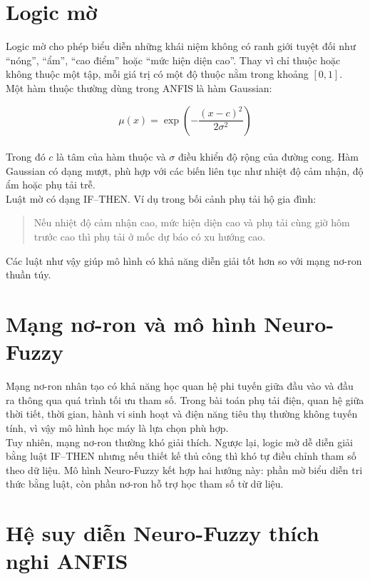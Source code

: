 \section{Logic mờ}

Logic mờ cho phép biểu diễn những khái niệm không có ranh giới tuyệt đối như ``nóng'', ``ẩm'', ``cao điểm'' hoặc ``mức hiện diện cao''. Thay vì chỉ thuộc hoặc không thuộc một tập, mỗi giá trị có một độ thuộc nằm trong khoảng $[0, 1]$.
\\
Một hàm thuộc thường dùng trong ANFIS là hàm Gaussian:

\begin{equation}
  \mu(x) = \exp\left(-\frac{(x-c)^2}{2\sigma^2}\right)
\end{equation}
\\
Trong đó $c$ là tâm của hàm thuộc và $\sigma$ điều khiển độ rộng của đường cong. Hàm Gaussian có dạng mượt, phù hợp với các biến liên tục như nhiệt độ cảm nhận, độ ẩm hoặc phụ tải trễ.
\\
Luật mờ có dạng IF--THEN. Ví dụ trong bối cảnh phụ tải hộ gia đình:

\begin{quote}
Nếu nhiệt độ cảm nhận cao, mức hiện diện cao và phụ tải cùng giờ hôm trước cao thì phụ tải ở mốc dự báo có xu hướng cao.
\end{quote}

Các luật như vậy giúp mô hình có khả năng diễn giải tốt hơn so với mạng nơ-ron thuần túy.

\section{Mạng nơ-ron và mô hình Neuro-Fuzzy}

Mạng nơ-ron nhân tạo có khả năng học quan hệ phi tuyến giữa đầu vào và đầu ra thông qua quá trình tối ưu tham số. Trong bài toán phụ tải điện, quan hệ giữa thời tiết, thời gian, hành vi sinh hoạt và điện năng tiêu thụ thường không tuyến tính, vì vậy mô hình học máy là lựa chọn phù hợp.
\\
Tuy nhiên, mạng nơ-ron thường khó giải thích. Ngược lại, logic mờ dễ diễn giải bằng luật IF--THEN nhưng nếu thiết kế thủ công thì khó tự điều chỉnh tham số theo dữ liệu. Mô hình Neuro-Fuzzy kết hợp hai hướng này: phần mờ biểu diễn tri thức bằng luật, còn phần nơ-ron hỗ trợ học tham số từ dữ liệu.

\section{Hệ suy diễn Neuro-Fuzzy thích nghi ANFIS}

